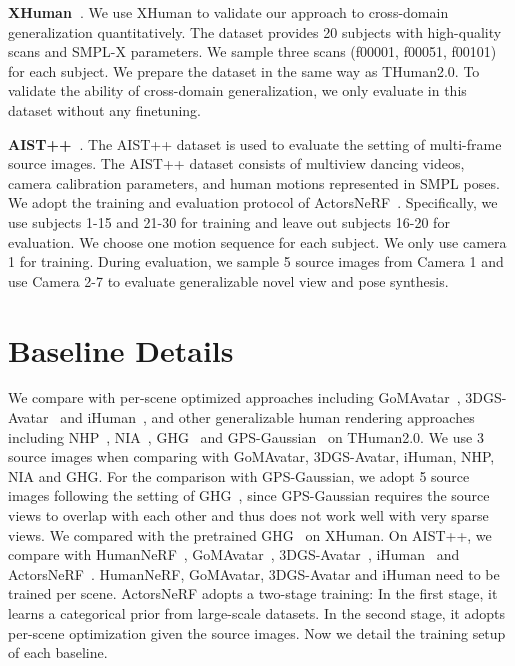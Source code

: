 \textbf{XHuman~\citep{shen2023xavatar}}. We use XHuman to validate our approach to cross-domain generalization quantitatively. The dataset provides 20 subjects with high-quality scans and SMPL-X parameters. We sample three scans (f00001, f00051, f00101) for each subject. We prepare the dataset in the same way as THuman2.0. To validate the ability of cross-domain generalization, we only evaluate in this dataset without any finetuning.

\textbf{AIST++~\citep{li2021learn}}.  The AIST++ dataset is used to evaluate the setting of multi-frame source images. The AIST++ dataset consists of multiview dancing videos, camera calibration parameters, and human motions represented in SMPL poses. We adopt the training and evaluation protocol of ActorsNeRF~\citep{mu2023actorsnerf}. Specifically, we use subjects 1-15 and 21-30 for training and leave out subjects 16-20 for evaluation. We choose one motion sequence for each subject. We only use camera 1 for training. During evaluation, we sample 5 source images from Camera 1 and use Camera 2-7 to evaluate generalizable novel view and pose synthesis.

\section{Baseline Details}
\label{sec: appendix_baseline}
We compare with per-scene optimized approaches including GoMAvatar~\citep{wen2024gomavatar}, 3DGS-Avatar~\citep{qian20243dgs} and iHuman~\citep{paudel2024ihuman}, and other generalizable human rendering approaches including NHP~\citep{kwon2021neural}, NIA~\citep{kwon2023neural}, GHG~\citep{kwon2024ghg} and GPS-Gaussian~\citep{zheng2024gpsgaussian} on THuman2.0. We use 3 source images when comparing with GoMAvatar, 3DGS-Avatar, iHuman, NHP, NIA and GHG. 
For the comparison with GPS-Gaussian, we adopt 5 source images following the setting of GHG~\citep{kwon2024ghg}, since GPS-Gaussian requires the source views to overlap with each other and thus does not work well with very sparse views. We compared with the pretrained GHG~\citep{kwon2024ghg} on XHuman. On AIST++, we compare with HumanNeRF~\citep{Weng2022HumanNeRFFR}, GoMAvatar~\citep{wen2024gomavatar}, 3DGS-Avatar~\citep{qian20243dgs}, iHuman~\citep{paudel2024ihuman} and ActorsNeRF~\citep{mu2023actorsnerf}. HumanNeRF, GoMAvatar, 3DGS-Avatar and iHuman need to be trained per scene. ActorsNeRF adopts a two-stage training: In the first stage, it learns a categorical prior from large-scale datasets. In the second stage, it adopts per-scene optimization given the source images. Now we detail the training setup of each baseline.

